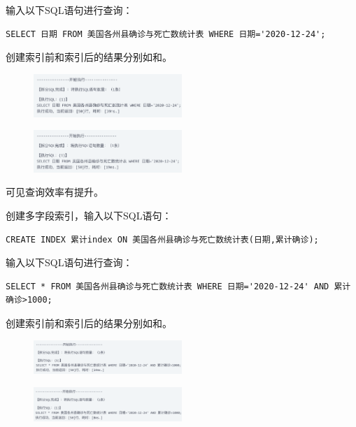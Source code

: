 \documentclass[lang=cn,11pt,a4paper,cite=authornum]{paper}
\begin{document}
输入以下SQL语句进行查询：
\begin{code}
\begin{verbatim}
SELECT 日期 FROM 美国各州县确诊与死亡数统计表 WHERE 日期='2020-12-24';
\end{verbatim}
\end{code}

创建索引前和索引后的结果分别如和。
\begin{figure}[!htb]
    \centering
    \includegraphics[width=0.5\textwidth]{./images/res14.png}
    \caption{\label{fig:res14}}
\end{figure}
\begin{figure}[!htb]
    \centering
    \includegraphics[width=0.5\textwidth]{./images/res15.png}
    \caption{\label{fig:res15}}
\end{figure}

可见查询效率有提升。

创建多字段索引，输入以下SQL语句：
\begin{code}
\begin{verbatim}
CREATE INDEX 累计index ON 美国各州县确诊与死亡数统计表(日期,累计确诊);
\end{verbatim}
\end{code}

输入以下SQL语句进行查询：
\begin{code}
\begin{verbatim}
SELECT * FROM 美国各州县确诊与死亡数统计表 WHERE 日期='2020-12-24' AND 累计确诊>1000;
\end{verbatim}
\end{code}

创建索引前和索引后的结果分别如和。
\begin{figure}[!htb]
    \centering
    \includegraphics[width=0.5\textwidth]{./images/res16.png}
    \caption{\label{fig:res16}}
\end{figure}
\begin{figure}[!htb]
    \centering
    \includegraphics[width=0.5\textwidth]{./images/res17.png}
    \caption{\label{fig:res17}}
\end{figure}
\end{document}
